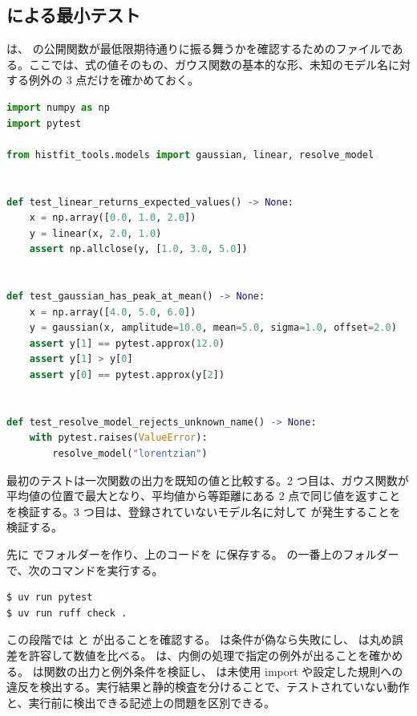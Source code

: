 \subsection{ による最小テスト}

 は、 の公開関数が最低限期待通りに振る舞うかを確認するためのファイルである。ここでは、式の値そのもの、ガウス関数の基本的な形、未知のモデル名に対する例外の 3 点だけを確かめておく。

\begin{lstlisting}[language=Python, title={tests/test\_models.py}]
import numpy as np
import pytest

from histfit_tools.models import gaussian, linear, resolve_model


def test_linear_returns_expected_values() -> None:
    x = np.array([0.0, 1.0, 2.0])
    y = linear(x, 2.0, 1.0)
    assert np.allclose(y, [1.0, 3.0, 5.0])


def test_gaussian_has_peak_at_mean() -> None:
    x = np.array([4.0, 5.0, 6.0])
    y = gaussian(x, amplitude=10.0, mean=5.0, sigma=1.0, offset=2.0)
    assert y[1] == pytest.approx(12.0)
    assert y[1] > y[0]
    assert y[0] == pytest.approx(y[2])


def test_resolve_model_rejects_unknown_name() -> None:
    with pytest.raises(ValueError):
        resolve_model("lorentzian")
\end{lstlisting}

最初のテストは一次関数の出力を既知の値と比較する。2 つ目は、ガウス関数が平均値の位置で最大となり、平均値から等距離にある 2 点で同じ値を返すことを検証する。3 つ目は、登録されていないモデル名に対して  が発生することを検証する。

先に  でフォルダーを作り、上のコードを  に保存する。 の一番上のフォルダーで、次のコマンドを実行する。

\begin{lstlisting}[numbers=none, xleftmargin=2\zw]
$ uv run pytest
$ uv run ruff check .
\end{lstlisting}

この段階では  と  が出ることを確認する。 は条件が偽なら失敗にし、 は丸め誤差を許容して数値を比べる。 は、内側の処理で指定の例外が出ることを確かめる。 は関数の出力と例外条件を検証し、 は未使用 import や設定した規則への違反を検出する。実行結果と静的検査を分けることで、テストされていない動作と、実行前に検出できる記述上の問題を区別できる。

